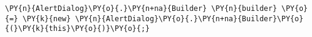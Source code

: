 \begin{Verbatim}[commandchars=\\\{\}]
\PY{n}{AlertDialog}\PY{o}{.}\PY{n+na}{Builder} \PY{n}{builder} \PY{o}{=} \PY{k}{new} \PY{n}{AlertDialog}\PY{o}{.}\PY{n+na}{Builder}\PY{o}{(}\PY{k}{this}\PY{o}{)}\PY{o}{;}
\end{Verbatim}
